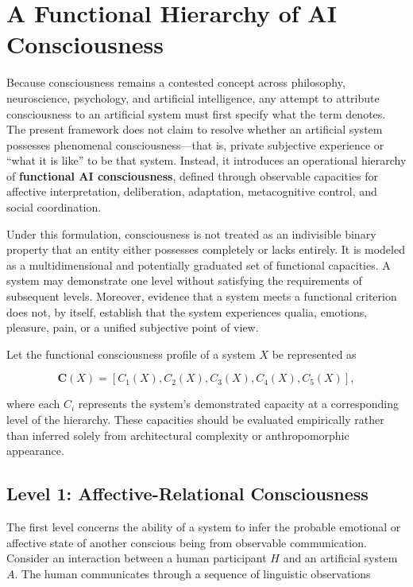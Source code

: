 \section{A Functional Hierarchy of AI Consciousness}

Because consciousness remains a contested concept across philosophy, neuroscience, psychology, and artificial intelligence, any attempt to attribute consciousness to an artificial system must first specify what the term denotes. The present framework does not claim to resolve whether an artificial system possesses phenomenal consciousness—that is, private subjective experience or “what it is like” to be that system. Instead, it introduces an operational hierarchy of \textbf{functional AI consciousness}, defined through observable capacities for affective interpretation, deliberation, adaptation, metacognitive control, and social coordination.

Under this formulation, consciousness is not treated as an indivisible binary property that an entity either possesses completely or lacks entirely. It is modeled as a multidimensional and potentially graduated set of functional capacities. A system may demonstrate one level without satisfying the requirements of subsequent levels. Moreover, evidence that a system meets a functional criterion does not, by itself, establish that the system experiences qualia, emotions, pleasure, pain, or a unified subjective point of view.

Let the functional consciousness profile of a system \(X\) be represented as

\begin{equation}\label{eq1}
\mathbf{C}(X)=
\left[
C_1(X),C_2(X),C_3(X),C_4(X),C_5(X)
\right],
\end{equation}

where each \(C_i\) represents the system’s demonstrated capacity at a corresponding level of the hierarchy. These capacities should be evaluated empirically rather than inferred solely from architectural complexity or anthropomorphic appearance.

\subsection{Level 1: Affective-Relational Consciousness}

The first level concerns the ability of a system to infer the probable emotional or affective state of another conscious being from observable communication. Consider an interaction between a human participant \(H\) and an artificial system \(A\). The human communicates through a sequence of linguistic observations

